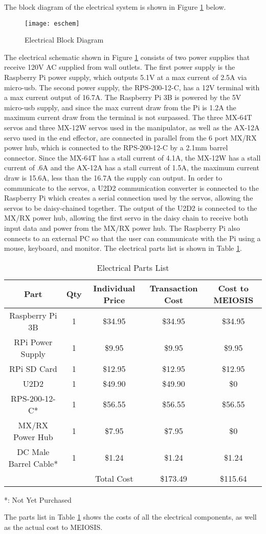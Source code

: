 The block diagram of the electrical system is shown in Figure \ref{fig:ElectricalBlockDiagram} below.
\begin{figure}[htp]
  \centering
  \texttt{[image: eschem]}
  \caption{Electrical Block Diagram}
  \label{fig:ElectricalBlockDiagram}
\end{figure}
The electrical schematic shown in Figure \ref{fig:ElectricalBlockDiagram} consists of two power supplies that receive 120V AC supplied from wall outlets. The first power supply is the Raspberry Pi power supply, which outputs 5.1V at a max current of 2.5A via micro-usb. The second power supply, the RPS-200-12-C, has a 12V terminal with a max current output of 16.7A. The Raspberry Pi 3B is powered by the 5V micro-usb supply, and since the max current draw from the Pi is 1.2A the maximum current draw from the terminal is not surpassed. The three MX-64T servos and three MX-12W servos used in the manipulator, as well as the AX-12A servo used in the end effector, are connected in parallel from the 6 port MX/RX power hub, which is connected to the RPS-200-12-C by a 2.1mm barrel connector. Since the MX-64T has a stall current of 4.1A, the MX-12W has a stall current of .6A and the AX-12A has a stall current of 1.5A, the maximum current draw is 15.6A, less than the 16.7A the supply can output. In order to communicate to the servos, a U2D2 communication converter is connected to the Raspberry Pi which creates a serial connection used by the servos, allowing the servos to be daisy-chained together. The output of the U2D2 is connected to the MX/RX power hub, allowing the first servo in the daisy chain to receive both input data and power from the MX/RX power hub. The Raspberry Pi also connects to an external PC so that the user can communicate with the Pi using a mouse, keyboard, and monitor. The electrical parts list is shown in Table \ref{tab:ElectricalPartsList}.
\newpage
\begin{table}[htp]
  \center
  \caption{ Electrical Parts List}
  \label{tab:ElectricalPartsList}
  \begin{tabular}{c|c|c|c|c}
  Part & Qty & Individual Price & Transaction Cost & Cost to MEIOSIS \\\hline
  Raspberry Pi 3B & 1 & \$34.95 & \$34.95 & \$34.95 \\
  RPi Power Supply & 1 & \$9.95 & \$9.95 & \$9.95 \\
  RPi SD Card & 1 & \$12.95 & \$12.95 & \$12.95 \\
  U2D2 & 1 & \$49.90 & \$49.90 & \$0 \\
  RPS-200-12-C* & 1 & \$56.55 & \$56.55 & \$56.55 \\
  MX/RX Power Hub & 1 & \$7.95 & \$7.95 & \$0 \\
  DC Male Barrel Cable* & 1 & \$1.24 & \$1.24 & \$1.24 \\
  & & Total Cost & \$173.49 & \$115.64 \\
  \end{tabular}
  \small{*: Not Yet Purchased}
\end{table}

The parts list in Table \ref{tab:ElectricalPartsList} shows the costs of all the electrical components, as well as the actual cost to MEIOSIS.
